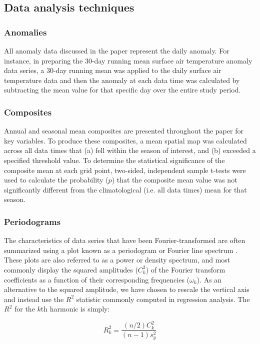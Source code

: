 \subsection{Data analysis techniques}

\subsubsection{Anomalies}
All anomaly data discussed in the paper represent the daily anomaly. For instance, in preparing the 30-day running mean surface air temperature anomaly data series, a 30-day running mean was applied to the daily surface air temperature data and then the anomaly at each data time was calculated by subtracting the mean value for that specific day over the entire study period.

\subsubsection{Composites}
Annual and seasonal mean composites are presented throughout the paper for key variables. To produce these composites, a mean spatial map was calculated across all data times that (a) fell within the season of interest, and (b) exceeded a specified threshold value. To determine the statistical significance of the composite mean at each grid point, two-sided, independent sample t-tests were used to calculate the probability ($p$) that the composite mean value was not significantly different from the climatological (i.e. all data times) mean for that season.

\subsubsection{Periodograms}
The characteristics of data series that have been Fourier-transformed are often summarized using a plot known as a periodogram or Fourier line spectrum \citep{Wilks2011}. These plots are also referred to as a power or density spectrum, and most commonly display the squared amplitudes ($C_k^2$) of the Fourier transform coefficients as a function of their corresponding frequencies ($\omega_k$). As an alternative to the squared amplitude, we have chosen to rescale the vertical axis and instead use the $R^2$ statistic commonly computed in regression analysis. The $R^2$ for the $k$th harmonic is simply:

\begin{equation}\label{eq:variance_explained}
R_k^2 = \frac{(n/2)C_k^2}{(n-1)s_y^2}
\end{equation}

